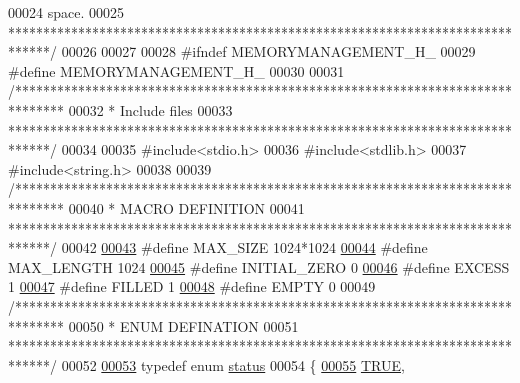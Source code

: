 \begin{DoxyCode}
00024 \textcolor{comment}{           space.  }
00025 \textcolor{comment}{ ******************************************************************************/}
00026 
00027 
00028 \textcolor{preprocessor}{#ifndef  MEMORYMANAGEMENT\_H\_}
00029 \textcolor{preprocessor}{#define  MEMORYMANAGEMENT\_H\_}
00030 
00031 \textcolor{comment}{/*******************************************************************************}
00032 \textcolor{comment}{ * Include files}
00033 \textcolor{comment}{ ******************************************************************************/}
00034 
00035 \textcolor{preprocessor}{#include<stdio.h>}
00036 \textcolor{preprocessor}{#include<stdlib.h>}
00037 \textcolor{preprocessor}{#include<string.h>}
00038 
00039 \textcolor{comment}{/*******************************************************************************}
00040 \textcolor{comment}{ * MACRO DEFINITION}
00041 \textcolor{comment}{ ******************************************************************************/}
00042 
\hypertarget{memory_management_8h_source_l00043}{}\hyperlink{memory_management_8h_a0592dba56693fad79136250c11e5a7fe}{00043} \textcolor{preprocessor}{#define MAX\_SIZE       1024*1024}
\hypertarget{memory_management_8h_source_l00044}{}\hyperlink{memory_management_8h_a7a9a231e30b47bc0345749c8bd1e5077}{00044} \textcolor{preprocessor}{#define MAX\_LENGTH     1024}
\hypertarget{memory_management_8h_source_l00045}{}\hyperlink{memory_management_8h_a4d11bc62f87fecb66ddb08bbe922e468}{00045} \textcolor{preprocessor}{#define INITIAL\_ZERO   0}
\hypertarget{memory_management_8h_source_l00046}{}\hyperlink{memory_management_8h_a5ce8e34830796387c57019ed0548fef1}{00046} \textcolor{preprocessor}{#define EXCESS         1}
\hypertarget{memory_management_8h_source_l00047}{}\hyperlink{memory_management_8h_a07f4c6f14c1c3bcd57756a5e3a41e3bd}{00047} \textcolor{preprocessor}{#define FILLED         1}
\hypertarget{memory_management_8h_source_l00048}{}\hyperlink{memory_management_8h_a2b7cf2a3641be7b89138615764d60ba3}{00048} \textcolor{preprocessor}{#define EMPTY          0}
00049 \textcolor{comment}{/*******************************************************************************}
00050 \textcolor{comment}{ * ENUM DEFINATION}
00051 \textcolor{comment}{ ******************************************************************************/}
00052 
\hypertarget{memory_management_8h_source_l00053}{}\hyperlink{memory_management_8h_a015eb90e0de9f16e87bd149d4b9ce959}{00053} \textcolor{keyword}{typedef} \textcolor{keyword}{enum} \hyperlink{memory_management_8h_a015eb90e0de9f16e87bd149d4b9ce959}{status}
00054 \{
\hypertarget{memory_management_8h_source_l00055}{}\hyperlink{memory_management_8h_a015eb90e0de9f16e87bd149d4b9ce959aa82764c3079aea4e60c80e45befbb839}{00055}     \hyperlink{memory_management_8h_a015eb90e0de9f16e87bd149d4b9ce959aa82764c3079aea4e60c80e45befbb839}{TRUE},

\end{DoxyCode}
